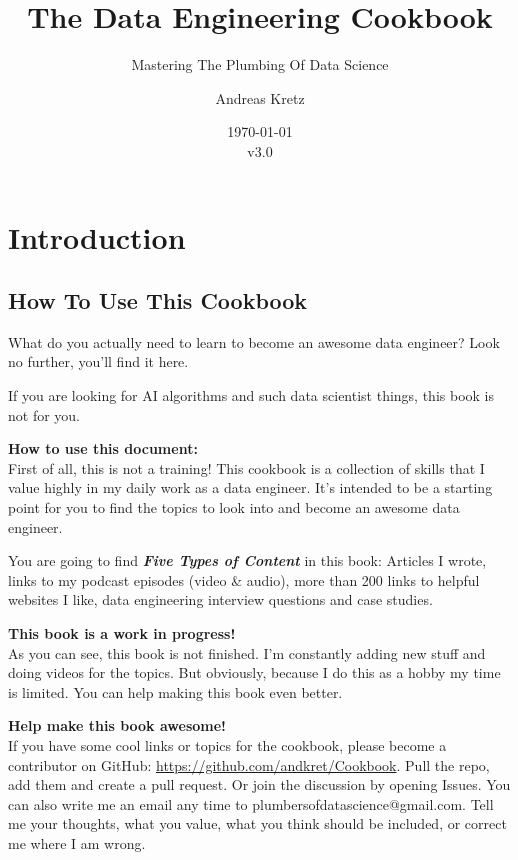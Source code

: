 \documentclass[12pt, numbers=noenddot]{scrreprt} %
\title{The Data Engineering Cookbook}
\subtitle{Mastering The Plumbing Of Data Science}
\author{Andreas Kretz}
\date{\today\\v3.0}
\begin{document}
\maketitle


\pagebreak

\setcounter{tocdepth}{3}
\tableofcontents

\pagebreak

\part{Introduction}
\chapter{How To Use This Cookbook}
What do you actually need to learn to become an awesome data engineer?
Look no further, you'll find it here.

If you are looking for AI algorithms and such data scientist things, this book is not for you.

\textbf{How to use this document:} \\
First of all, this is not a training! This cookbook is a collection of skills that I value highly in my daily work as a data engineer. It's intended to be a starting point for you to find the topics to look into and become an awesome data engineer.

You are going to find \textbf{\textit{Five Types of Content}} in this book: Articles I wrote, links to my podcast episodes (video \& audio), more than 200 links to helpful websites I like, data engineering interview questions and case studies. 

\textbf{This book is a work in progress!} \\
As you can see, this book is not finished. I'm constantly adding new stuff and doing videos for the topics. But obviously, because I do this as a hobby my time is limited. You can help making this book even better.

\textbf{Help make this book awesome!}\\
If you have some cool links or topics for the cookbook, please become a contributor on GitHub: \url{https://github.com/andkret/Cookbook}. Pull the repo, add them and create a pull request. Or join the discussion by opening Issues.
You can also write me an email any time to plumbersofdatascience@gmail.com. Tell me your thoughts, what you value, what you think should be included, or correct me where I am wrong.
\end{document}
